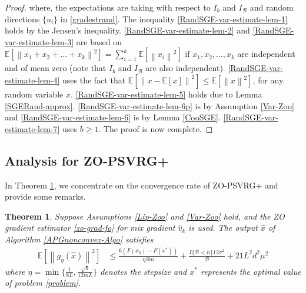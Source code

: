 \documentclass{article}
\newcommand*{\E}{\mathbb{E}}
\newcommand{\norm}[1]{\left\lVert#1\right\rVert}
\newtheorem{theorem}{Theorem}[section]
\theoremstyle{definition}
\theoremstyle{remark}
\begin{document}
\begin{proof}
 where, the expectations are taking with respect to $I_b$ and $I_{\mathcal{B}}$ and random directions $\{u_i\}$ in \eqref{gradestrand}. The inequality \eqref{RandSGE-var-estimate-lem-1} holds by the Jensen’s inequality. \eqref{RandSGE-var-estimate-lem-2} and \eqref{RandSGE-var-estimate-lem-3} are based on $\E[\norm{x_1+x_2+\ldots+x_k}^2] = \sum_{i=1}^k \E[\norm{x_i}^2]$ if $x_1,x_2,\ldots,x_k$ are independent and of mean zero (note that $I_b$ and $I_{\mathcal{B}}$ are also independent). \eqref{RandSGE-var-estimate-lem-4} uses the fact that $\E[\norm{x-\E[x]}^2] \leq \E[\norm{x}^2]$, for any random variable $x$. \eqref{RandSGE-var-estimate-lem-5} holds due to Lemma \ref{SGERand-approx}. \eqref{RandSGE-var-estimate-lem-6p} is by Assumption \ref{Var-Zoo} and  \eqref{RandSGE-var-estimate-lem-6} is by Lemma \ref{CooSGE}. \eqref{RandSGE-var-estimate-lem-7} uses $b\geq 1$. The proof is now complete.
\end{proof}
\subsection{Analysis for ZO-PSVRG+}
In Theorem \ref{noncon-zoo-coord}, we concentrate on the convergence rate of ZO-PSVRG+ and provide some remarks.

\begin{theorem}\label{noncon-zoo-coord}
Suppose Assumptions \ref{Lip-Zoo} and \ref{Var-Zoo} hold, and the ZO gradient estimator \eqref{zo-grad-fo} for mix gradient $\hat{v}_k$ is used. The output $\hat{x}$ of Algorithm \ref{APGnonconvex-Algo} satisfies
  \begin{equation}\label{noncon-zoo-main}
  \begin{split}
\E[\norm{g_{\eta}(\hat{x})}^2] & \leq \frac{6\left(F(x_0) - F({x}^*)\right)}{\eta Sm} + \frac{I\{\mathcal{B} < n\}12\sigma ^2}{\mathcal{B}}+21{L^2 d^2 \mu^2}
\end{split}
 \end{equation}
where $\eta = \min\{\frac{1}{8L}, \frac{\sqrt{b}}{12mL}\}$ denotes the stepsize and $x^*$ represents the optimal value of problem \ref{problem}.
\end{theorem}
\end{document}
